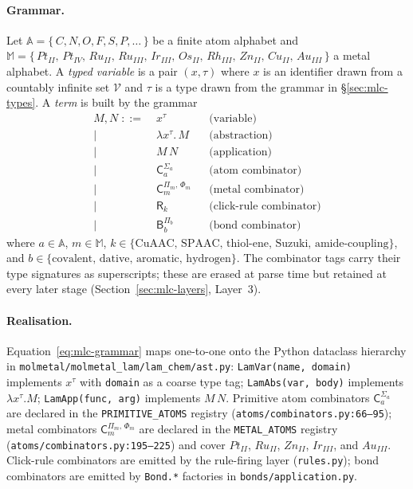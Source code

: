 \paragraph{Grammar.}
Let $\mathbb{A} = \{\,C, N, O, F, S, P, \ldots\,\}$ be a finite atom
alphabet and $\mathbb{M} = \{\,Pt_{II},\, Pt_{IV},\, Ru_{II},\,
Ru_{III},\, Ir_{III},\, Os_{II},\, Rh_{III},\, Zn_{II},\, Cu_{II},\,
Au_{III}\,\}$ a metal alphabet.
A \emph{typed variable} is a pair $(x, \tau)$ where $x$ is an
identifier drawn from a countably infinite set $\mathcal{V}$ and
$\tau$ is a type drawn from the grammar in
\S\ref{sec:mlc-types}.
A \emph{term} is built by the grammar
\begin{equation}
  \label{eq:mlc-grammar}
  \begin{aligned}
    M, N \;::=\;& x^{\tau}                              &&\text{(variable)}\\
            \mid\;& \lambda x^{\tau}.\, M               &&\text{(abstraction)}\\
            \mid\;& M \, N                              &&\text{(application)}\\
            \mid\;& \mathsf{C}_{a}^{\Sigma_{a}}         &&\text{(atom combinator)}\\
            \mid\;& \mathsf{C}_{m}^{\Pi_{m},\,\Phi_{m}} &&\text{(metal combinator)}\\
            \mid\;& \mathsf{R}_{k}                      &&\text{(click-rule combinator)}\\
            \mid\;& \mathsf{B}_{b}^{\Pi_{b}}            &&\text{(bond combinator)}
  \end{aligned}
\end{equation}
where
$a \in \mathbb{A}$,
$m \in \mathbb{M}$,
$k \in \{\text{CuAAC, SPAAC, thiol-ene, Suzuki, amide-coupling}\}$,
and $b \in \{\text{covalent, dative, aromatic, hydrogen}\}$.
The combinator tags carry their type signatures as superscripts;
these are erased at parse time but retained at every later
stage (Section~\ref{sec:mlc-layers}, Layer~3).

\paragraph{Realisation.}
Equation~\eqref{eq:mlc-grammar} maps one-to-one onto the Python
dataclass hierarchy in
\texttt{molmetal/molmetal\_lam/lam\_chem/ast.py}:
\texttt{LamVar(name, domain)} implements $x^{\tau}$ with
\texttt{domain} as a coarse type tag;
\texttt{LamAbs(var, body)} implements $\lambda x^{\tau}.M$;
\texttt{LamApp(func, arg)} implements $M\,N$.
Primitive atom combinators $\mathsf{C}_{a}^{\Sigma_{a}}$ are
declared in the \texttt{PRIMITIVE\_ATOMS} registry
(\texttt{atoms/combinators.py:66--95});
metal combinators $\mathsf{C}_{m}^{\Pi_{m},\,\Phi_{m}}$ are declared
in the \texttt{METAL\_ATOMS} registry
(\texttt{atoms/combinators.py:195--225}) and cover
$Pt_{II}$, $Ru_{II}$, $Zn_{II}$, $Ir_{III}$, and $Au_{III}$.
Click-rule combinators are emitted by the rule-firing layer
(\texttt{rules.py}); bond combinators are emitted by
\texttt{Bond.*} factories in \texttt{bonds/application.py}.

